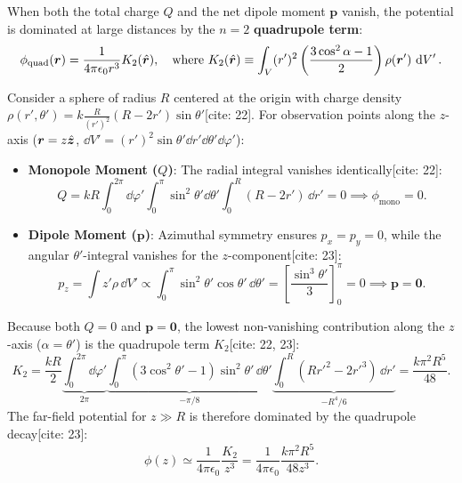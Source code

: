 When both the total charge \(Q\) and the net dipole moment \(\bm{p}\) vanish, the potential is dominated at large distances by the \(n = 2\) \textbf{quadrupole term}:
\begin{equation}
    \phi_{\text{quad}}(\bm{r}) = \frac{1}{4\pi\epsilon_0 r^3} K_2(\hat{\bm{r}}), \quad \text{where } K_2(\hat{\bm{r}}) \equiv \int_V (r')^2 \left(\frac{3\cos^2\alpha - 1}{2}\right)\rho(\bm{r}')\,\dd{V'}.
\end{equation}

\begin{example}
Consider a sphere of radius \(R\) centered at the origin with charge density \(\rho(r',\theta') = k\frac{R}{(r')^2}(R - 2r')\sin\theta'\)[cite: 22]. For observation points along the \(z\)-axis (\(\bm{r} = z\hat{\bm{z}}\), \(\dd{V'} = (r')^2\sin\theta'\dd{r'}\dd{\theta'}\dd{\varphi'}\)):
\begin{itemize}
    \item \textbf{Monopole Moment (\(Q\))}: The radial integral vanishes identically[cite: 22]:
    \begin{equation}
        Q = kR \int_0^{2\pi}\dd{\varphi'} \int_0^\pi \sin^2\theta'\dd{\theta'} \int_0^R (R - 2r')\,\dd{r'} = 0 \implies \phi_{\text{mono}} = 0.
    \end{equation}
    \item \textbf{Dipole Moment (\(\bm{p}\))}: Azimuthal symmetry ensures \(p_x = p_y = 0\), while the angular \(\theta'\)-integral vanishes for the \(z\)-component[cite: 23]:
    \begin{equation}
        p_z = \int z'\rho\,\dd{V'} \propto \int_0^\pi \sin^2\theta'\cos\theta'\,\dd{\theta'} = \left[\frac{\sin^3\theta'}{3}\right]_0^\pi = 0 \implies \bm{p} = \bm{0}.
    \end{equation}
\end{itemize}
\end{example}

\begin{example}
Because both \(Q = 0\) and \(\bm{p} = \bm{0}\), the lowest non-vanishing contribution along the \(z\)-axis (\(\alpha = \theta'\)) is the quadrupole term \(K_2\)[cite: 22, 23]:
\begin{equation}
    K_2 = \frac{kR}{2} \underbrace{\int_0^{2\pi}\dd{\varphi'}}_{2\pi} \underbrace{\int_0^\pi (3\cos^2\theta' - 1)\sin^2\theta'\,\dd{\theta'}}_{-\pi/8} \underbrace{\int_0^R (Rr'^2 - 2r'^3)\,\dd{r'}}_{-R^4/6} = \frac{k\pi^2 R^5}{48}.
\end{equation}
The far-field potential for \(z \gg R\) is therefore dominated by the quadrupole decay[cite: 23]:
\begin{equation}
    \phi(z) \simeq \frac{1}{4\pi\epsilon_0}\frac{K_2}{z^3} = \frac{1}{4\pi\epsilon_0}\frac{k\pi^2 R^5}{48 z^3}.
\end{equation}
\end{example}

